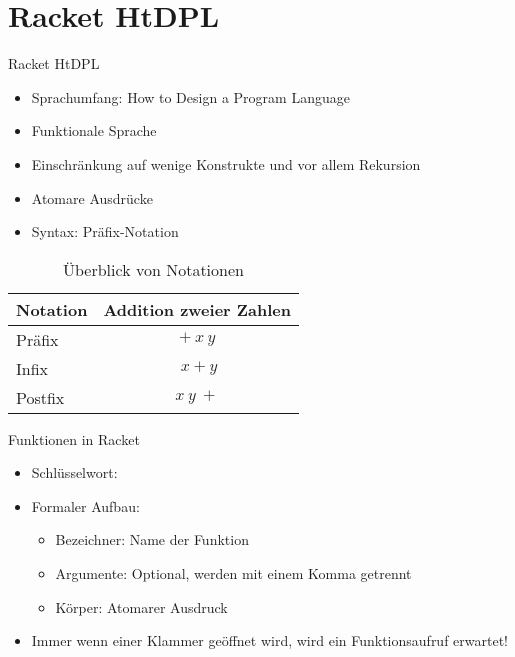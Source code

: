 \documentclass{../tuda-beamer}
\begin{document}
  \section{Racket HtDPL}
  \begin{frame}{Racket HtDPL}
    \begin{itemize}
      \item Sprachumfang: How to Design a Program Language
      \item Funktionale Sprache
      \item Einschränkung auf wenige Konstrukte und vor allem Rekursion
      \item Atomare Ausdrücke
      \item Syntax: Präfix-Notation
    \end{itemize}

    \begin{table}[h]
      \centering
      \begin{tabular}{lc}
        \toprule
        \textbf{Notation} & \textbf{Addition zweier Zahlen}
        \\
        \midrule
        Präfix & \(+ \ x \ y\)
        \\
        Infix & \(\ x + y\)
        \\
        Postfix & \(x \ y \ +\)
        \\
        \bottomrule
      \end{tabular}
      \caption{Überblick von Notationen}
    \end{table}
  \end{frame}

  \begin{frame}{Funktionen in Racket}
    \begin{itemize}
      \item Schlüsselwort: 
      \item Formaler Aufbau:
      \begin{center}
      \end{center}
      \begin{itemize}
        \item Bezeichner: Name der Funktion
        \item Argumente: Optional, werden mit einem Komma getrennt
        \item Körper: Atomarer Ausdruck
      \end{itemize}
      \item Immer wenn einer Klammer geöffnet wird, wird ein Funktionsaufruf erwartet!
    \end{itemize}
  \end{frame}
\end{document}
